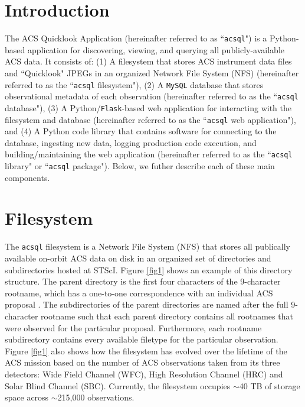 \documentclass[11pt,twoside]{article}
\begin{document}
\section{Introduction}

The ACS Quicklook Application (hereinafter referred to as ``\texttt{acsql}") is a Python-based application for discovering, viewing, and
querying all publicly-available ACS data.  It consists of: (1) A filesystem that stores ACS instrument data files
and ``Quicklook" JPEGs in an organized Network File System (NFS) (hereinafter referred to as the ``\texttt{acsql} filesystem"), (2) A
\texttt{MySQL} database that stores observational metadata of each observation (hereinafter referred to as the ``\texttt{acsql} database"),
(3) A Python/\texttt{Flask}-based web application for interacting with the filesystem and database (hereinafter referred to as the
``\texttt{acsql} web application"), and (4) A Python code library that contains software for connecting to the database, ingesting new data,
logging production code execution, and building/maintaining the web application (hereinafter referred to as the ``\texttt{acsql} library"
or ``\texttt{acsql} package").  Below, we futher describe each of these main components.


\section{Filesystem}

The \texttt{acsql} filesystem is a Network File System (NFS) that stores all publically available on-orbit ACS data on disk in an
organized set of directories and subdirectories hosted at STScI. Figure \ref{fig1} shows an example of this directory structure.  The
parent directory is the first four characters of the 9-character rootname, which has a one-to-one correspondence with an
individual ACS proposal \citet{smith}. The subdirectories of the parent directories are named after the full 9-character rootname such that
each parent directory contains all rootnames that were observed for the particular proposal.  Furthermore, each rootname
subdirectory contains every available filetype for the particular observation. Figure \ref{fig1} also shows how the filesystem has
evolved over the lifetime of the ACS mission based on the number of ACS observations taken from its three detectors: Wide Field Channel (WFC),
High Resolution Channel (HRC) and Solar Blind Channel (SBC).  Currently, the filesystem occupies $\sim${40} TB of storage space across
$\sim$215,000 observations.
\end{document}
